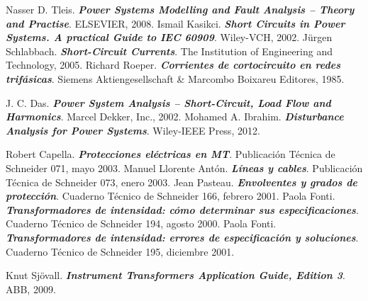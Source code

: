 \begin{thebibliography}{99}
     Nasser D. Tleis. \textbf{\textit{Power Systems Modelling and Fault Analysis -- Theory and Practise}}.  ELSEVIER, 2008.
     Ismail Kasikci. \textbf{\textit{Short Circuits in Power Systems. A practical Guide to IEC 60909}}.  Wiley-VCH, 2002.
     Jürgen Schlabbach. \textbf{\textit{Short-Circuit Currents}}.  The Institution of Engineering and Technology, 2005.
     Richard Roeper. \textbf{\textit{Corrientes de cortocircuito en redes trifásicas}}.  Siemens Aktiengesellschaft \& Marcombo Boixareu Editores, 1985.

     J. C. Das. \textbf{\textit{Power System Analysis -- Short-Circuit, Load Flow and Harmonics}}. Marcel Dekker, Inc., 2002.
     Mohamed A. Ibrahim. \textbf{\textit{Disturbance Analysis for Power Systems}}. Wiley-IEEE Press, 2012.

     Robert Capella. \textbf{\textit{Protecciones eléctricas en MT}}.  Publicación Técnica de Schneider 071, mayo 2003.
     Manuel Llorente Antón. \textbf{\textit{Líneas y cables}}.  Publicación Técnica de Schneider 073, enero 2003.
     Jean Pasteau. \textbf{\textit{Envolventes y grados de protección}}.  Cuaderno Técnico de Schneider 166, febrero 2001.
     Paola Fonti. \textbf{\textit{Transformadores de intensidad: cómo determinar sus especificaciones}}.  Cuaderno Técnico de Schneider 194, agosto 2000.
     Paola Fonti. \textbf{\textit{Transformadores de intensidad: errores de especificación y soluciones}}.  Cuaderno Técnico de Schneider 195, diciembre 2001.

     Knut Sjövall. \textbf{\textit{Instrument Transformers Application Guide, Edition 3}}.  ABB, 2009.

\end{thebibliography}

